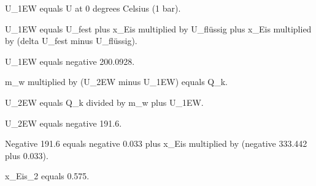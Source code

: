 U_1EW equals U at 0 degrees Celsius (1 bar).  

U_1EW equals U_fest plus x_Eis multiplied by U_flüssig plus x_Eis multiplied by (delta U_fest minus U_flüssig).  

U_1EW equals negative 200.0928.  

m_w multiplied by (U_2EW minus U_1EW) equals Q_k.  

U_2EW equals Q_k divided by m_w plus U_1EW.  

U_2EW equals negative 191.6.  

Negative 191.6 equals negative 0.033 plus x_Eis multiplied by (negative 333.442 plus 0.033).  

x_Eis_2 equals 0.575.